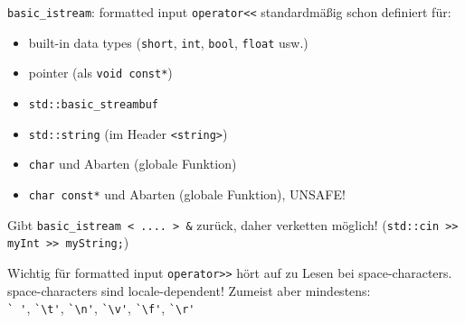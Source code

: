 \begin{frame}[fragile]{\texttt{basic\_istream}: formatted input}
	\texttt{operator<<} standardmäßig schon definiert für:
	\begin{itemize}
		\item built-in data types (\texttt{short}, \texttt{int}, \texttt{bool}, \texttt{float} usw.)
		\item pointer (als \texttt{void const*})
		\item \texttt{std::basic\_streambuf}
		\item \texttt{std::string} (im Header \texttt{<string>})
		\item \texttt{char} und Abarten {\tiny (globale Funktion)}
		\item \texttt{char const*} und Abarten {\tiny (globale Funktion)}, \alert{UNSAFE!}
	\end{itemize}
	Gibt \texttt{basic\_istream < .... > \&} zurück, daher verketten möglich! (\texttt{std::cin >> myInt >> myString;})
	
	\pause
	\vspace{1em}
	
	\begin{block}{Wichtig für formatted input}
		\texttt{operator>>} hört auf zu Lesen bei space-characters.
		space-characters sind locale-dependent! Zumeist aber mindestens:\\
		\verb|` '|, \verb|`\t'|, \verb|`\n'|, \verb|`\v'|, \verb|`\f'|, \verb|`\r'|
	\end{block}
\end{frame}

